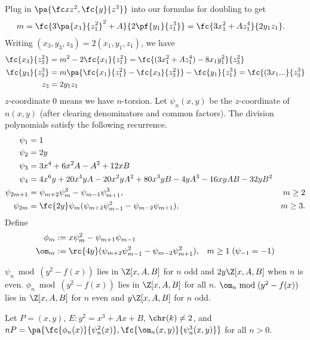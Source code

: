 Plug in $\pa{\fc x{z^2},\fc{y}{z^3}}$ into our formulas for doubling to get
\begin{align*}
m&=\fc{3\pa{x_1}{z_1^2}^2+A}{2\pf{y_1}{z_1^3}}=\fc{3x_1^2+Az_1^4}{2y_1z_1}.
\end{align*}
Writing $(x_3,y_3,z_3)=2(x_1,y_1,z_1)$, we have
\begin{align*}
\fc{x_3}{z_3^2}&=m^2-2\fc{x_1}{z_1^2} = \fc{(3x_1^2+Az_1^4)-8x_1y_1^2}{z_3^2}\\
\fc{y_3}{z_3^3}&=m\pa{\fc{x_1}{z_1^2}-\fc{x_3}{z_3^2}}-\fc{y_1}{z_1^3}=\fc{(3x_1...}{z_3^3}\\
z_3&=2y_1z_1
\end{align*}
$z$-coordinate 0 means we have $n$-torsion. Let $\psi_n(x,y)$ be the $z$-coordinate of $n(x,y)$ (after clearing denominators and common factors).
The division polynomials satisfy the following recurrence.
\begin{align*}
\psi_1&=1\\
\psi_2&=2y\\
\psi_3&=3x^4+6x^2A-A^2+12xB\\
\psi_4&=4x^6y+20x^4yA-20x^2yA^2+80x^3yB-4yA^3 -16xyAB-32yB^2\\
\psi_{2m+1}&=\psi_{m+2}\psi_m^3-\psi_{m-1}\psi_{m+1}^3 ,& m\ge 2\\
\psi_{2m}&=\fc{2y} \psi_m(\psi_{m+2}\psi_{m-1}^2-\psi_{m-2}\psi_{m+1}),&m\ge 3.
\end{align*}
Define
\begin{align*}
\phi_m&:=x\psi_m^2 -\psi_{m+1}\psi_{m-1}\\
\om_m&:=\rc{4y}(\psi_{m+2}\psi_{m-1}^2-\psi_{m-2}\psi_{m+1}^2),&m\ge 1\;(\psi_{-1}=-1)
\end{align*}
\begin{lem}
$\psi_n\bmod{(y^2-f(x))}$ lies in $\Z[x,A,B]$ for $n$ odd  and $2y\Z[x,A,B]$ when $n$ is even. $\phi_n\bmod{(y^2-f(x))}$ lies in $\Z[x,A,B]$ for all $n$. $\om_n\bmod{(y^2-f(x))}$ lies in $\Z[x,A,B]$ for $n$ even and $y\Z[x,A,B]$ for $n$ odd.

\end{lem}
\begin{thm}
Let $P=(x,y)$, $E:y^2=x^3+Ax+B$, $\chr(k)\ne 2$, and $nP=\pa{\fc{\phi_n(x)}{\psi_n^2(x)},\fc{\om_n(x,y)}{\psi_n^3(x,y)}}$ for all $n>0$. %
\end{thm}
